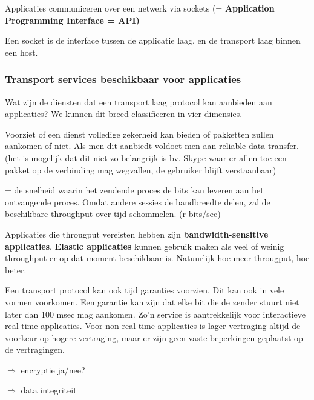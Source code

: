 \noindent Applicaties communiceren over een netwerk via sockets (= \textbf{Application Programming Interface = API)}

\noindent Een socket is de interface tussen de applicatie laag, en de transport laag binnen een host.

\subsubsection{Transport services beschikbaar voor applicaties}

Wat zijn de diensten dat een transport laag protocol kan aanbieden aan applicaties? We kunnen dit breed classificeren in vier dimensies.


Voorziet of een dienst volledige zekerheid kan bieden of pakketten zullen aankomen of niet. Als men dit aanbiedt voldoet men aan reliable data transfer.(het is mogelijk dat dit niet zo belangrijk is bv. Skype waar er af en toe een pakket op de verbinding mag wegvallen, de gebruiker blijft verstaanbaar)


= de snelheid waarin het zendende proces de bits kan leveren aan het ontvangende proces. Omdat andere sessies de bandbreedte delen, zal de beschikbare throughput over tijd schommelen. (r bits/sec)

\noindent Applicaties die througput vereisten hebben zijn \textbf{bandwidth-sensitive applicaties}. 
\noindent \textbf{Elastic applicaties} kunnen gebruik maken als veel of weinig throughput er op dat moment beschikbaar is. Natuurlijk hoe meer througput, hoe beter.


Een transport protocol kan ook tijd garanties voorzien. Dit kan ook in vele vormen voorkomen. Een garantie kan zijn dat elke bit die de zender stuurt niet later dan 100 msec mag aankomen. Zo’n service is aantrekkelijk voor interactieve real-time applicaties. Voor non-real-time applicaties is lager vertraging altijd de voorkeur op hogere vertraging, maar er zijn geen vaste beperkingen geplaatst op de vertragingen.


\noindent $\Rightarrow$ encryptie ja/nee?

\noindent $\Rightarrow$ data integriteit

